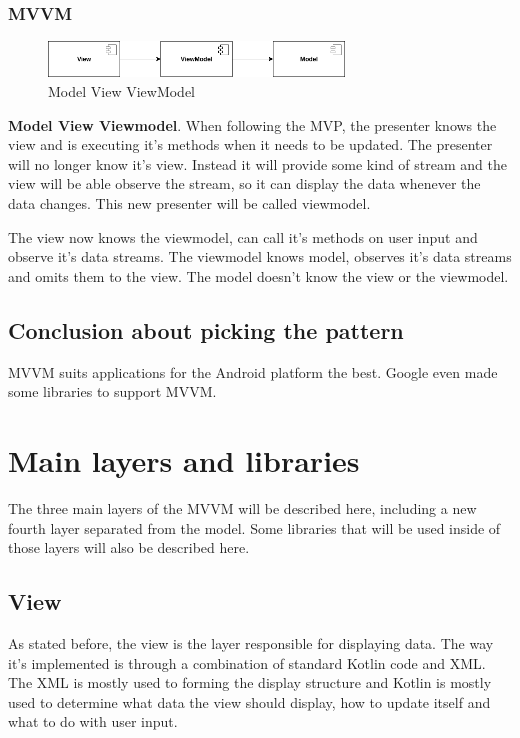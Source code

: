 \subsubsection{MVVM}
\label{subsec:mvvm}

\begin{figure}\centering
	\includegraphics[width=0.7\textwidth]{pics/patterns/bc-mvvm.png}
	\caption[MVVM]{Model View ViewModel}\label{fig:mvvm}
\end{figure}

\textbf{Model View Viewmodel}.
When following the MVP, the presenter knows the view and is executing it's methods when it needs to be updated.
The presenter will no longer know it's view.
Instead it will provide some kind of stream and the view will be able observe the stream, so it can display the data whenever the data changes.
This new presenter will be called viewmodel.

The view now knows the viewmodel, can call it's methods on user input and observe it's data streams.
The viewmodel knows model, observes it's data streams and omits them to the view.
The model doesn't know the view or the viewmodel.

\subsection{Conclusion about picking the pattern}
MVVM suits applications for the Android platform the best.
Google even made some libraries to support MVVM.

\section{Main layers and libraries}
The three main layers of the MVVM will be described here, including a new fourth layer separated from the model.
Some libraries that will be used inside of those layers will also be described here.

\subsection{View}
As stated before, the view is the layer responsible for displaying data.
The way it's implemented is through a combination of standard Kotlin code and XML.
The XML is mostly used to forming the display structure and Kotlin is mostly used to determine what data the view should display, how to update itself and what to do with user input.

